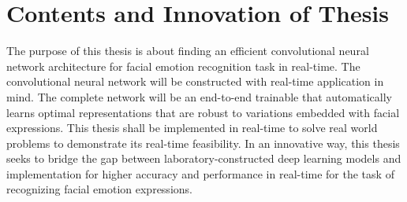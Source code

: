 \documentclass[master]{thesis-uestc}
\begin{document}
\section{Contents and Innovation of Thesis}
The purpose of this thesis is about finding an efficient convolutional neural network architecture for facial emotion recognition task in real-time. The convolutional neural network will be constructed with real-time application in mind. The complete network will be an end-to-end trainable that automatically learns optimal representations that are robust to variations embedded with facial expressions. This thesis shall be implemented in real-time to solve real world problems to demonstrate its real-time feasibility. In an innovative way, this thesis seeks to bridge the gap between laboratory-constructed deep learning models and implementation for higher accuracy and performance in real-time for the task of recognizing facial emotion expressions.
\end{document}
